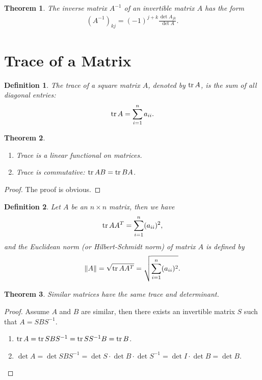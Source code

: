 \documentclass[10pt]{book}
\newtheorem{definition}{Definition}[chapter]
\newtheorem{theorem}{Theorem}[chapter]
\theoremstyle{definition}
\numberwithin{equation}{chapter}
\begin{document}
\begin{theorem}
The inverse matrix $A^{-1}$ of an invertible matrix $A$ has the form
\begin{align*}
    \left(A^{-1}\right)_{kj} = (-1)^{j+k} \frac{\det A_{jk}}{\det A}.
\end{align*}
\end{theorem}

\medskip

\section{Trace of a Matrix}
\begin{definition}\label{definition_trace}
The trace of a square matrix $A$, denoted by $\tr A$, is the sum of all diagonal entries:
\begin{align*}
    \tr A = \sum^n_{i=1} a_{ii}.
\end{align*}
\end{definition}

\medskip

\begin{theorem}
~\begin{enumerate}[label=(\alph*)]
    \item Trace is a linear functional on matrices.
    \item Trace is commutative: $\tr AB = \tr BA$.
\end{enumerate}
\end{theorem}
\begin{proof}
The proof is obvious.
\end{proof}

\medskip

\begin{definition}
Let $A$ be an $n\times n$ matrix, then we have 
\begin{align*}
    \tr AA^T = \sum^n_{i=1}(a_{ii})^2,
\end{align*}
and the Euclidean norm (or Hilbert-Schmidt norm) of matrix $A$ is defined by \begin{align*}
    \|A\| = \sqrt{\tr AA^T} = \sqrt{\sum^n_{i=1}(a_{ii})^2}.
\end{align*}
\end{definition}

\medskip

\begin{theorem}\label{trace_property}
Similar matrices have the same trace and determinant.
\end{theorem}
\begin{proof}
Assume $A$ and $B$ are similar, then there exists an invertible matrix $S$ such that $A = SBS^{-1}$.
\begin{enumerate}[label=(\alph*)]
    \item $\tr A = \tr SBS^{-1} =\tr SS^{-1}B = \tr B$.
    \item $\det A = \det SBS^{-1} = \det S\cdot \det B \cdot \det S^{-1} = \det I\cdot \det B = \det B$.
\end{enumerate}
\end{proof}
\end{document}
